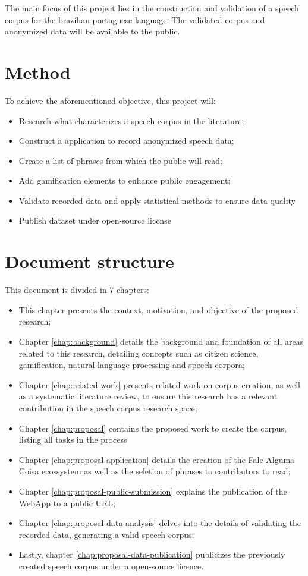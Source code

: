 The main focus of this project lies in the construction and validation of a speech corpus for the brazilian portuguese language. The validated corpus and anonymized data will be available to the public.

\section*{Method}

To achieve the aforementioned objective, this project will:

\begin{itemize}
    \item Research what characterizes a speech corpus in the literature;
    \item Construct a application to record anonymized speech data;
    \item Create a list of phrases from which the public will read;
    \item Add gamification elements to enhance public engagement;
    \item Validate recorded data and apply statistical methods to ensure data quality
    \item Publish dataset under open-source license
\end{itemize}

\section*{Document structure}

This document is divided in 7 chapters:

\begin{itemize}
    \item This chapter presents the context, motivation, and objective of the proposed research;
    \item Chapter \ref{chap:background} details the background and foundation of all areas related to this research, detailing concepts such as citizen science, gamification, natural language processing and speech corpora;
    \item Chapter \ref{chap:related-work} presents related work on corpus creation, as well as a systematic literature review, to ensure this research has a relevant contribution in the speech corpus research space;
    \item Chapter \ref{chap:proposal} contains the proposed work to create the corpus, listing all tasks in the process
    \item Chapter \ref{chap:proposal-application} details the creation of the Fale Alguma Coisa ecossystem as well as the seletion of phrases to contributors to read;
    \item Chapter \ref{chap:proposal-public-submission} explains the publication of the WebApp to a public URL;
    \item Chapter \ref{chap:proposal-data-analysis} delves into the details of validating the recorded data, generating a valid speech corpus;
    \item Lastly, chapter \ref{chap:proposal-data-publication} publicizes the previously created speech corpus under a open-source licence.
\end{itemize}
